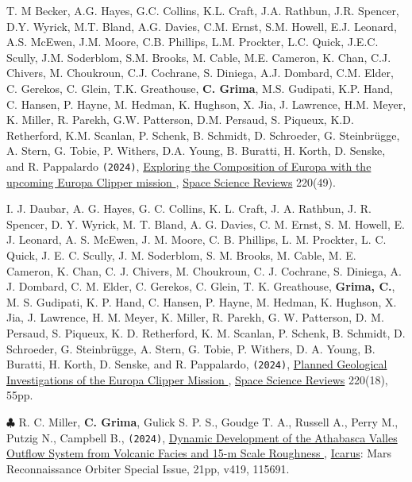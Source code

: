 \begin{etaremune}
\item
  T. M Becker, A.G. Hayes, G.C. Collins, K.L. Craft, J.A. Rathbun, J.R. Spencer, D.Y. Wyrick, M.T. Bland, A.G. Davies, C.M. Ernst, S.M. Howell, E.J. Leonard, A.S. McEwen, J.M. Moore, C.B. Phillips, L.M. Prockter, L.C. Quick, J.E.C. Scully, J.M. Soderblom, S.M. Brooks, M. Cable, M.E. Cameron, K. Chan, C.J. Chivers, M. Choukroun, C.J. Cochrane, S. Diniega, A.J. Dombard, C.M. Elder, C. Gerekos, C. Glein, T.K. Greathouse, \textbf{C. Grima}, M.S. Gudipati, K.P. Hand, C. Hansen, P. Hayne, M. Hedman, K. Hughson, X. Jia, J. Lawrence, H.M. Meyer, K. Miller, R. Parekh, G.W. Patterson, D.M. Persaud, S. Piqueux, K.D. Retherford, K.M. Scanlan, P. Schenk, B. Schmidt, D. Schroeder, G. Steinbrügge, A. Stern, G. Tobie, P. Withers, D.A. Young, B. Buratti, H. Korth, D. Senske, and R. Pappalardo \texttt{(2024)}, \href{https://link.springer.com/article/10.1007/s11214-024-01069-y}{Exploring the Composition of Europa with the upcoming Europa Clipper mission \aiOpenAccessSquare}, \ul{Space Science Reviews} 220(49).

\item
  I. J. Daubar, A. G. Hayes, G. C. Collins, K. L. Craft, J. A. Rathbun, J. R. Spencer, D. Y. Wyrick, M. T. Bland, A. G. Davies, C. M. Ernst, S. M. Howell, E. J. Leonard, A. S. McEwen, J. M. Moore, C. B. Phillips, L. M. Prockter, L. C. Quick, J. E. C. Scully, J. M. Soderblom, S. M. Brooks, M. Cable, M. E. Cameron, K. Chan, C. J. Chivers, M. Choukroun, C. J. Cochrane, S. Diniega, A. J. Dombard, C. M. Elder, C. Gerekos, C. Glein, T. K. Greathouse, \textbf{Grima, C.}, M. S. Gudipati, K. P. Hand, C. Hansen, P. Hayne, M. Hedman, K. Hughson, X. Jia, J. Lawrence, H. M. Meyer, K. Miller, R. Parekh, G. W. Patterson, D. M. Persaud, S. Piqueux, K. D. Retherford, K. M. Scanlan, P. Schenk, B. Schmidt, D. Schroeder, G. Steinbrügge, A. Stern, G. Tobie, P. Withers, D. A. Young, B. Buratti, H. Korth, D. Senske, and R. Pappalardo, \texttt{(2024)}, \href{https://link.springer.com/article/10.1007/s11214-023-01036-z?utm_source=rct_congratemailt&utm_medium=email&utm_campaign=oa_20240212&utm_content=10.1007/s11214-023-01036-z}{Planned Geological Investigations of the Europa Clipper Mission \aiOpenAccessSquare}, \ul{Space Science Reviews} 220(18), 55pp.

\item
  $\clubsuit$ R. C. Miller, \textbf{C. Grima}, Gulick S. P. S., Goudge T. A., Russell A., Perry M., Putzig N., Campbell B., \texttt{(2024)}, \href{https://doi.org/10.1016/j.icarus.2023.115691}{Dynamic Development of the Athabasca Valles Outflow System from Volcanic Facies and 15-m Scale Roughness \aiOpenAccessSquare}, \ul{Icarus}: Mars Reconnaissance Orbiter Special Issue, 21pp, v419, 115691.  


\end{etaremune}
